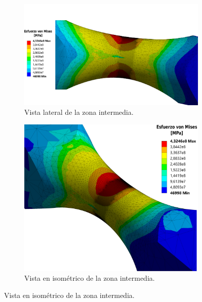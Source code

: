 \begin{figure}[p]
\centering
	\begin{subfigure}{\linewidth}
		\centering
		\includegraphics[width=\linewidth]{Imagenes/r_lat.pdf}
		\caption{Vista lateral de la zona intermedia.}
		\label{fig:r_lat}
	\end{subfigure}
	\begin{subfigure}{0.8\linewidth}
		\centering
		\includegraphics[width=\linewidth]{Imagenes/r_iso.pdf}
		\caption{Vista en isométrico de la zona intermedia.}
		\label{fig:r_iso}
	\end{subfigure}
\end{figure}
